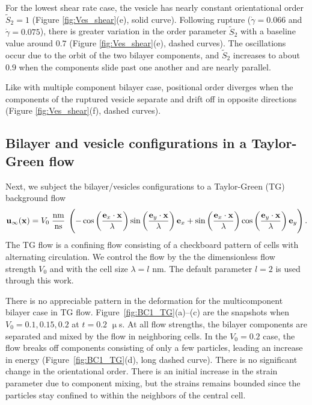 \documentclass[prb,preprint,showpacs,preprintnumbers,amsmath,amssymb,longbibliography]{revtex4-1}
\newcommand{\xx}{\mathbf{x}}
\newcommand{\uu}{\mathbf{u}}
\begin{document}
For the lowest shear rate case, the vesicle has nearly constant orientational order $\tilde S_2 = 1$
(Figure \ref{fig:Ves_shear}(e), solid curve).
Following rupture ($\dot\gamma= 0.066$ and $\dot \gamma= 0.075$),
there is greater variation in the order parameter $\tilde{S}_2$
with a baseline value around $0.7$
(Figure \ref{fig:Ves_shear}(e), dashed curves).
The oscillations occur due to the orbit of the two bilayer components,
and $\tilde{S}_2$ increases to about $0.9$ when the components slide past one another and are nearly parallel.

Like with multiple component bilayer case, positional order diverges when the components of the ruptured
vesicle separate and drift off in opposite directions (Figure \ref{fig:Ves_shear}(f), dashed curves).


\subsection{Bilayer and vesicle configurations in a Taylor-Green flow}
Next, we subject the bilayer/vesicles configurations to a 
Taylor-Green (TG) background flow
\begin{equation}
\label{eq:tg_flow}
\uu_\infty(\xx) = V_0\; \frac{\text{nm}}{\text{ns}}\;
\left(
-\cos\left(\frac{{\bf e}_x\cdot\xx}{\lambda}\right)
 \sin\left(\frac{{\bf e}_y\cdot\xx}{\lambda}\right)
         {\bf e}_x
         +\sin\left(\frac{{\bf e}_x\cdot\xx}{\lambda}\right)
         \cos\left(\frac{{\bf e}_y\cdot\xx}{\lambda}\right)
             {\bf e}_y\right).
\end{equation}
The TG flow is a confining flow consisting of a checkboard pattern
of cells with alternating circulation.  We control the flow by the
the dimensionless flow strength $V_0$ and with the cell size $\lambda = l$ nm.
The default parameter $l=2$ is used through this work.
%



There is no appreciable pattern in the deformation for the multicomponent bilayer case in TG flow. 
Figure~\ref{fig:BC1_TG}(a)--(c) are the snapshots when $V_0=0.1,0.15,0.2$ at $t = 0.2$ $\upmu$s.
At all flow strengths, the bilayer components are separated and mixed by the flow in neighboring cells. 
In the $V_0 = 0.2$ case, the flow breaks off components consisting of only a few particles,
leading an increase in energy (Figure~\ref{fig:BC1_TG}(d), long dashed curve).
There is no significant change in the orientational order.  There is an initial increase in the
strain parameter due to component mixing, but the strains remains bounded since the particles
stay confined to within the neighbors of the central cell.  
\end{document}
